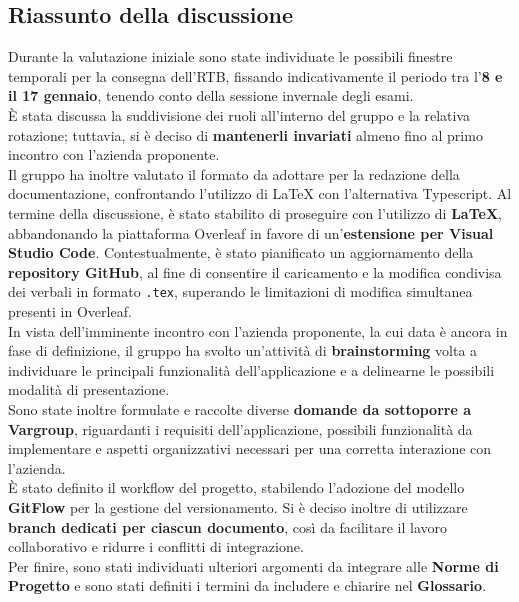 \documentclass[a4paper, 11pt]{article}
\begin{document}
\subsection{Riassunto della discussione}
Durante la valutazione iniziale sono state individuate le possibili finestre temporali per la consegna dell’RTB, fissando indicativamente il periodo tra l’\textbf{8 e il 17 gennaio}, tenendo conto della sessione invernale degli esami.
\\
È stata discussa la suddivisione dei ruoli all’interno del gruppo e la relativa rotazione; tuttavia, si è deciso di \textbf{mantenerli invariati} almeno fino al primo incontro con l’azienda proponente.
\\
Il gruppo ha inoltre valutato il formato da adottare per la redazione della documentazione, confrontando l’utilizzo di \LaTeX{} con l’alternativa Typescript. Al termine della discussione, è stato stabilito di proseguire con l’utilizzo di \textbf{\LaTeX{}}, abbandonando la piattaforma Overleaf in favore di un’\textbf{estensione per Visual Studio Code}. 
Contestualmente, è stato pianificato un aggiornamento della \textbf{repository GitHub}, al fine di consentire il caricamento e la modifica condivisa dei verbali in formato \texttt{.tex}, superando le limitazioni di modifica simultanea presenti in Overleaf.
\\
In vista dell’imminente incontro con l’azienda proponente, la cui data è ancora in fase di definizione, il gruppo ha svolto un’attività di \textbf{brainstorming} volta a individuare le principali funzionalità dell’applicazione e a delinearne le possibili modalità di presentazione.
\\
Sono state inoltre formulate e raccolte diverse \textbf{domande da sottoporre a Vargroup}, riguardanti i requisiti dell’applicazione, possibili funzionalità da implementare e aspetti organizzativi necessari per una corretta interazione con l’azienda.
\\
È stato definito il workflow del progetto, stabilendo l'adozione del modello \textbf{GitFlow} per la gestione del versionamento. Si è deciso inoltre di utilizzare \textbf{branch dedicati per ciascun documento}, così da facilitare il lavoro collaborativo e ridurre i conflitti di integrazione.
\\
Per finire, sono stati individuati ulteriori argomenti da integrare alle \textbf{Norme di Progetto} e sono stati definiti i termini da includere e chiarire nel \textbf{Glossario}.
\end{document}
